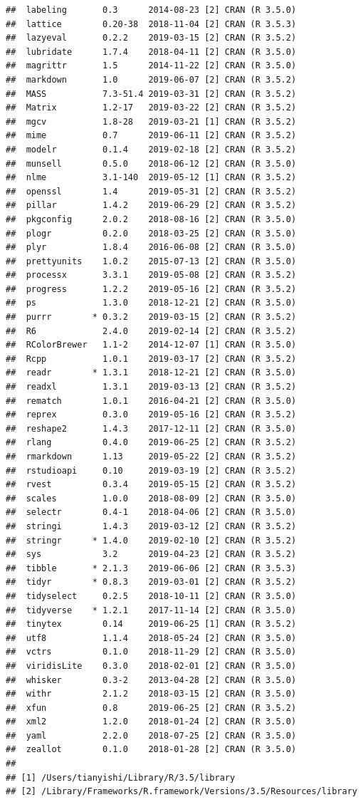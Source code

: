 \documentclass[]{book}
\begin{document}
\begin{verbatim}
##  labeling       0.3      2014-08-23 [2] CRAN (R 3.5.0)
##  lattice        0.20-38  2018-11-04 [2] CRAN (R 3.5.3)
##  lazyeval       0.2.2    2019-03-15 [2] CRAN (R 3.5.2)
##  lubridate      1.7.4    2018-04-11 [2] CRAN (R 3.5.0)
##  magrittr       1.5      2014-11-22 [2] CRAN (R 3.5.0)
##  markdown       1.0      2019-06-07 [2] CRAN (R 3.5.2)
##  MASS           7.3-51.4 2019-03-31 [2] CRAN (R 3.5.2)
##  Matrix         1.2-17   2019-03-22 [2] CRAN (R 3.5.2)
##  mgcv           1.8-28   2019-03-21 [1] CRAN (R 3.5.2)
##  mime           0.7      2019-06-11 [2] CRAN (R 3.5.2)
##  modelr         0.1.4    2019-02-18 [2] CRAN (R 3.5.2)
##  munsell        0.5.0    2018-06-12 [2] CRAN (R 3.5.0)
##  nlme           3.1-140  2019-05-12 [1] CRAN (R 3.5.2)
##  openssl        1.4      2019-05-31 [2] CRAN (R 3.5.2)
##  pillar         1.4.2    2019-06-29 [2] CRAN (R 3.5.2)
##  pkgconfig      2.0.2    2018-08-16 [2] CRAN (R 3.5.0)
##  plogr          0.2.0    2018-03-25 [2] CRAN (R 3.5.0)
##  plyr           1.8.4    2016-06-08 [2] CRAN (R 3.5.0)
##  prettyunits    1.0.2    2015-07-13 [2] CRAN (R 3.5.0)
##  processx       3.3.1    2019-05-08 [2] CRAN (R 3.5.2)
##  progress       1.2.2    2019-05-16 [2] CRAN (R 3.5.2)
##  ps             1.3.0    2018-12-21 [2] CRAN (R 3.5.0)
##  purrr        * 0.3.2    2019-03-15 [2] CRAN (R 3.5.2)
##  R6             2.4.0    2019-02-14 [2] CRAN (R 3.5.2)
##  RColorBrewer   1.1-2    2014-12-07 [1] CRAN (R 3.5.0)
##  Rcpp           1.0.1    2019-03-17 [2] CRAN (R 3.5.2)
##  readr        * 1.3.1    2018-12-21 [2] CRAN (R 3.5.0)
##  readxl         1.3.1    2019-03-13 [2] CRAN (R 3.5.2)
##  rematch        1.0.1    2016-04-21 [2] CRAN (R 3.5.0)
##  reprex         0.3.0    2019-05-16 [2] CRAN (R 3.5.2)
##  reshape2       1.4.3    2017-12-11 [2] CRAN (R 3.5.0)
##  rlang          0.4.0    2019-06-25 [2] CRAN (R 3.5.2)
##  rmarkdown      1.13     2019-05-22 [2] CRAN (R 3.5.2)
##  rstudioapi     0.10     2019-03-19 [2] CRAN (R 3.5.2)
##  rvest          0.3.4    2019-05-15 [2] CRAN (R 3.5.2)
##  scales         1.0.0    2018-08-09 [2] CRAN (R 3.5.0)
##  selectr        0.4-1    2018-04-06 [2] CRAN (R 3.5.0)
##  stringi        1.4.3    2019-03-12 [2] CRAN (R 3.5.2)
##  stringr      * 1.4.0    2019-02-10 [2] CRAN (R 3.5.2)
##  sys            3.2      2019-04-23 [2] CRAN (R 3.5.2)
##  tibble       * 2.1.3    2019-06-06 [2] CRAN (R 3.5.3)
##  tidyr        * 0.8.3    2019-03-01 [2] CRAN (R 3.5.2)
##  tidyselect     0.2.5    2018-10-11 [2] CRAN (R 3.5.0)
##  tidyverse    * 1.2.1    2017-11-14 [2] CRAN (R 3.5.0)
##  tinytex        0.14     2019-06-25 [1] CRAN (R 3.5.2)
##  utf8           1.1.4    2018-05-24 [2] CRAN (R 3.5.0)
##  vctrs          0.1.0    2018-11-29 [2] CRAN (R 3.5.0)
##  viridisLite    0.3.0    2018-02-01 [2] CRAN (R 3.5.0)
##  whisker        0.3-2    2013-04-28 [2] CRAN (R 3.5.0)
##  withr          2.1.2    2018-03-15 [2] CRAN (R 3.5.0)
##  xfun           0.8      2019-06-25 [2] CRAN (R 3.5.2)
##  xml2           1.2.0    2018-01-24 [2] CRAN (R 3.5.0)
##  yaml           2.2.0    2018-07-25 [2] CRAN (R 3.5.0)
##  zeallot        0.1.0    2018-01-28 [2] CRAN (R 3.5.0)
## 
## [1] /Users/tianyishi/Library/R/3.5/library
## [2] /Library/Frameworks/R.framework/Versions/3.5/Resources/library
\end{verbatim}
\end{document}
